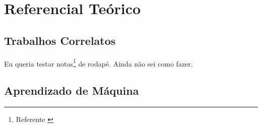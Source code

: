 \chapter{Referencial Teórico}\label{cap:refTeor}

\lipsum[34]

\section{Trabalhos Correlatos}\label{sec:primTrab}

Eu queria testar notas\footnote{Referente \cite{1}  } de rodapé\cite[Seilá]{3}. Ainda não sei como fazer.


\lipsum[34]
\section{Aprendizado de Máquina}\label{sec:aprendMaq}


\lipsum[35-36]
